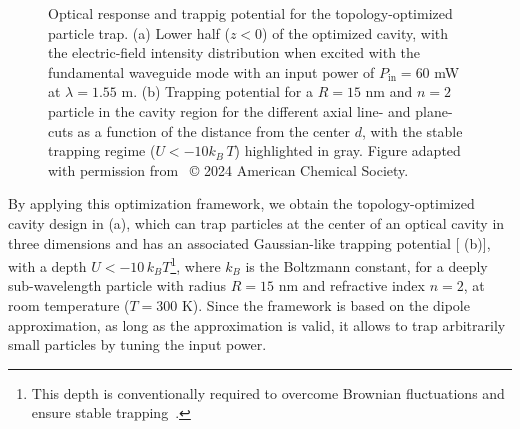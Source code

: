\begin{figure}[tb]
    \centering
    \caption{Optical response and trappig potential for the topology-optimized particle trap. (a) Lower half ($z<0$) of the optimized cavity, with the electric-field intensity
    distribution when excited with the fundamental waveguide mode with an input power of $P_\text{in}=60$ mW at $\lambda=1.55$ \textmu m. (b) Trapping potential for a $R=15$ nm and $n=2$ particle in the cavity region for the different axial line- and plane-cuts as a function
    of the distance from the center $d$, with the stable trapping regime ($U<-10 k_B\, T$) highlighted in gray. Figure adapted with permission from~\cite{ownpub1} © 2024 American Chemical Society.}
    \label{fig:MST_dipole}
\end{figure}

By applying this optimization framework, we obtain the topology-optimized cavity design in  (a), which can trap particles at the center of an optical
cavity in three dimensions and has an associated Gaussian-like trapping potential [ (b)], with a depth  $U<-10\, k_B T$\footnote{This depth is conventionally required to overcome Brownian fluctuations and ensure stable trapping~\cite{novotny}.}, where $k_B$ is the Boltzmann constant, for a deeply sub-wavelength particle with radius $R=15$ nm and refractive index $n=2$, at room temperature ($T=300$ K).
Since the framework is based on the dipole approximation,
as long as the approximation is valid, it allows to trap arbitrarily small particles by tuning the input power.

